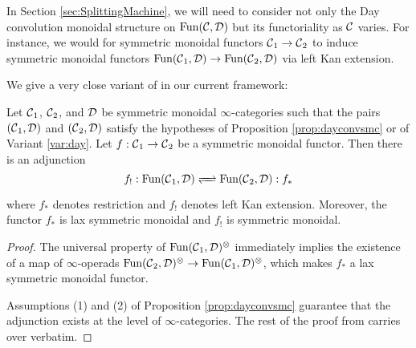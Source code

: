 In Section \ref{sec:SplittingMachine}, we will need to consider not only the Day convolution monoidal structure on $\operatorname{\text{Fun}}(\operatorname{\mathcal{C}},\operatorname{\mathcal{D}})$ but its functoriality as $\operatorname{\mathcal{C}}$ varies.  For instance, we would for symmetric monoidal functors $\operatorname{\mathcal{C}}_1 \to \operatorname{\mathcal{C}}_2$ to induce symmetric monoidal functors $\operatorname{\text{Fun}}(\operatorname{\mathcal{C}}_1,\operatorname{\mathcal{D}}) \to \operatorname{\text{Fun}}(\operatorname{\mathcal{C}}_2,\operatorname{\mathcal{D}})$ via left Kan extension.  

We give a very close variant of \cite[Corollary 3.8]{Nikolaus} in our current framework:

\begin{prop}\label{prop:kanmonoidal}
Let $\operatorname{\mathcal{C}}_1$, $\operatorname{\mathcal{C}}_2$, and $\operatorname{\mathcal{D}}$ be symmetric monoidal $\infty$-categories such that the pairs $(\operatorname{\mathcal{C}}_1, \operatorname{\mathcal{D}})$ and $(\operatorname{\mathcal{C}}_2, \operatorname{\mathcal{D}})$ satisfy the hypotheses of Proposition \ref{prop:dayconvsmc} or of Variant \ref{var:day}.  Let $f:\operatorname{\mathcal{C}}_1 \to \operatorname{\mathcal{C}}_2$ be a symmetric monoidal functor.  Then there is an adjunction 
$$ f_! : \Fun(\C_1, \D) \xrightleftharpoons{\quad} \Fun(\C_2, \D): f_* $$ %
where $f_*$ denotes restriction and $f_!$ denotes left Kan extension.  Moreover, the functor $f_*$ is lax symmetric monoidal and $f_!$ is symmetric monoidal.  
\end{prop}
\begin{proof}
The universal property of $\operatorname{\text{Fun}}(\operatorname{\mathcal{C}}_1, \operatorname{\mathcal{D}})^{\otimes}$ immediately implies the existence of a map of $\infty$-operads $\operatorname{\text{Fun}}(\operatorname{\mathcal{C}}_2,\operatorname{\mathcal{D}})^{\otimes} \to \operatorname{\text{Fun}}(\operatorname{\mathcal{C}}_1,\operatorname{\mathcal{D}})^{\otimes}$, which makes $f_*$ a lax symmetric monoidal functor.  

Assumptions (1) and (2) of Proposition \ref{prop:dayconvsmc} guarantee that the adjunction exists at the level of $\infty$-categories.  The rest of the proof from \cite[Corollary 3.8]{Nikolaus} carries over verbatim.  
\end{proof}


